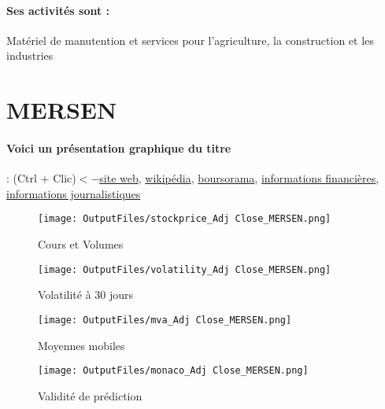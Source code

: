 \documentclass[11pt,a4paper]{report}%
\begin{document}
\paragraph{Ses activités sont : } Matériel de manutention et services pour l'agriculture, la construction et les industries  
    
    \newpage

\section{MERSEN}

\paragraph{Voici un présentation graphique du titre} : (Ctrl + Clic)$<-$\href{https://www.mersen.com/fr/investiseurs/profil}{site web}, \href{https://fr.wikipedia.org/wiki/Mersen}{wikipédia}, \href{https://www.boursorama.com/cours/1rPMRN}{boursorama}, \href{https://www.qwant.com/?q=site:https:%2f%2fwww.easybourse.com%2faction-societe%2fMERSEN&t=web&client=ext-firefox-hp}{informations financières}, \href{https://bourse.lerevenu.com/cours-de-bourse/fiche-valeur-synthese/MERSEN/MRN-FR}{informations journalistiques}
\begin{figure}[!htb]
   \begin{minipage}{0.5\textwidth}
     \centering
     \texttt{[image: OutputFiles/stockprice\_Adj Close\_MERSEN.png]}
     \caption{Cours et Volumes}\label{Fig:price_MERSEN}
   \end{minipage}\hfill
   \begin{minipage}{0.5\textwidth}
     \centering
     \texttt{[image: OutputFiles/volatility\_Adj Close\_MERSEN.png]}
     \caption{Volatilité à 30 jours}\label{Fig:volat_MERSEN}
   \end{minipage}
\end{figure}
\begin{figure}[!htb]
   \begin{minipage}{0.5\textwidth}
     \centering
     \texttt{[image: OutputFiles/mva\_Adj Close\_MERSEN.png]}
     \caption{Moyennes mobiles}\label{Fig:mva_MERSEN}
   \end{minipage}\hfill
   \begin{minipage}{0.5\textwidth}
     \centering
     \texttt{[image: OutputFiles/monaco\_Adj Close\_MERSEN.png]}
     \caption{Validité de prédiction}\label{Fig:prediction_MERSEN}
   \end{minipage}
\end{figure}
\end{document}
